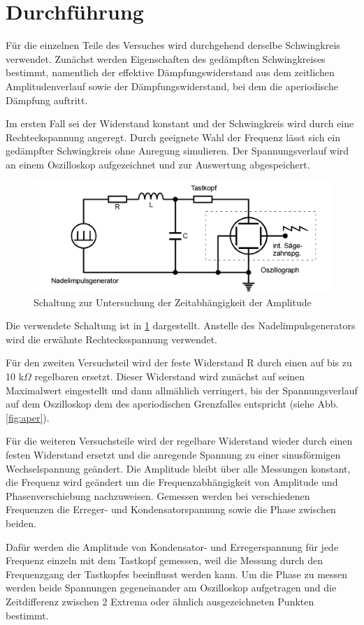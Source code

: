 \section{Durchführung}
\label{sec:Durchführung}
Für die einzelnen Teile des Versuches wird durchgehend derselbe Schwingkreis
verwendet. Zunächst werden Eigenschaften des gedämpften Schwingkreises bestimmt,
namentlich der effektive
Dämpfungswiderstand aus dem zeitlichen Amplitudenverlauf
sowie der Dämpfungswiderstand, bei dem die aperiodische
Dämpfung auftritt.

Im ersten Fall sei der Widerstand konstant und der Schwingkreis wird durch eine
Rechteckspannung angeregt. Durch geeignete Wahl der Frequenz lässt sich ein
gedämpfter Schwingkreis ohne Anregung simulieren. Der Spannungsverlauf wird
an einem Oszilloskop aufgezeichnet und zur Auswertung abgespeichert.
\begin{figure}
  \centering
  \includegraphics[keepaspectratio, width=\textwidth]{5a.png}
  \caption{Schaltung zur Untersuchung der Zeitabhängigkeit der Amplitude}
  \label{fig:5a}
\end{figure}
Die verwendete Schaltung ist in \ref{fig:5a} dargestellt. Anstelle des
Nadelimpulsgenerators wird die erwähnte Rechtecksspannung verwendet.

Für den zweiten Versuchsteil wird der feste Widerstand R durch einen auf bis zu
10 k$\Omega$ regelbaren ersetzt. Dieser Widerstand wird zunächst auf seinen
Maximalwert eingestellt und dann allmählich verringert, bis der Spannungsverlauf
auf dem Oszilloskop dem des aperiodischen Grenzfalles entspricht
(siehe Abb.\ref{fig:aper}).

Für die weiteren Versuchsteile wird der regelbare Widerstand wieder durch einen
festen Widerstand ersetzt und die anregende Spannung zu einer sinusförmigen
Wechselspannung geändert. Die Amplitude bleibt über alle Messungen konstant,
die Frequenz wird geändert um die Frequenzabhängigkeit von Amplitude und
Phasenverschiebung nachzuweisen.
Gemessen werden bei verschiedenen Frequenzen die Erreger- und
Kondensatorspannung sowie die Phase zwischen beiden.

Dafür werden die Amplitude von Kondensator- und Erregerspannung für jede
Frequenz einzeln mit dem Tastkopf gemessen,
weil die Messung durch den Frequenzgang der Tastkopfes beeinflusst werden kann.
Um die Phase zu messen werden beide Spannungen gegeneinander am Oszilloskop
aufgetragen und die Zeitdifferenz zwischen 2 Extrema oder ähnlich ausgezeichneten
Punkten bestimmt.
